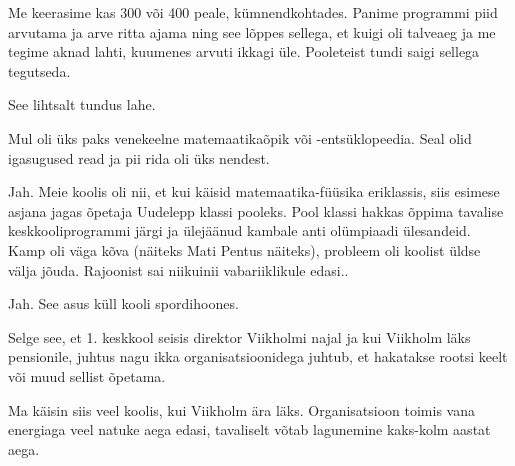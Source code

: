 Me keerasime kas 300 või 400 peale, kümnendkohtades. Panime programmi piid arvutama ja arve ritta ajama ning see lõppes sellega, et 
kuigi oli talveaeg ja me tegime aknad lahti, kuumenes arvuti ikkagi üle. 
Pooleteist tundi saigi sellega tegutseda.


See lihtsalt tundus lahe.


Mul oli üks paks venekeelne matemaatikaõpik või 
-entsüklopeedia. Seal olid igasugused read ja pii rida oli 
üks nendest.


Jah. Meie koolis oli nii, et kui käisid 
matemaatika-füüsika eriklassis, siis esimese asjana jagas õpetaja 
Uudelepp klassi pooleks. Pool klassi hakkas õppima tavalise 
keskkooliprogrammi järgi ja ülejäänud kambale anti olümpiaadi ülesandeid. 
Kamp oli väga kõva (näiteks Mati 
Pentus näiteks), probleem oli koolist üldse välja jõuda. Rajoonist sai 
niikuinii vabariiklikule edasi.. 


Jah. See asus küll kooli spordihoones. 

Selge see, et 1. keskkool seisis direktor Viikholmi najal ja kui 
Viikholm läks pensionile, juhtus nagu ikka organisatsioonidega juhtub, et 
hakatakse rootsi keelt või muud sellist õpetama.


Ma käisin siis veel koolis, kui Viikholm ära läks. Organisatsioon toimis vana energiaga 
veel natuke aega edasi, tavaliselt võtab lagunemine 
kaks-kolm aastat aega.


